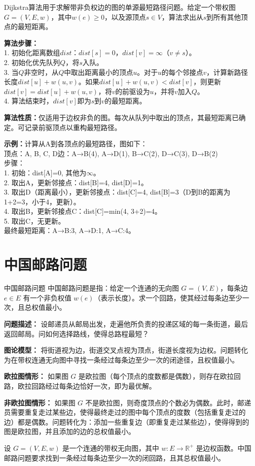 Dijkstra算法用于求解带非负权边的图的单源最短路径问题。给定一个带权图$G=(V,E,w)$，其中$w(e)\geqslant 0$，以及源顶点$s\in V$，算法求出从$s$到所有其他顶点的最短距离。

\textbf{算法步骤：}\\
1. 初始化距离数组$dist$：$dist[s]=0$，$dist[v]=\infty$（$v\neq s$）。\\
2. 初始化优先队列$Q$，将$s$入队。\\
3. 当$Q$非空时，从$Q$中取出距离最小的顶点$u$。对于$u$的每个邻接点$v$，计算新路径长度$dist[u]+w(u,v)$。如果$dist[u]+w(u,v)<dist[v]$，则更新$dist[v]=dist[u]+w(u,v)$，将$v$的前驱设为$u$，并将$v$加入$Q$。\\
4. 算法结束时，$dist[v]$即为$s$到$v$的最短距离。

\textbf{算法性质：}仅适用于边权非负的图。每次从队列中取出的顶点，其最短距离已确定。可记录前驱顶点以重构最短路径。

\textbf{示例：}计算从A到各顶点的最短路径，图如下：\\
顶点：A, B, C, D\quad 边：A→B(4), A→D(1), B→C(2), D→C(3), D→B(2)\\
步骤：\\
1. 初始：dist[A]=0, 其他为$\infty$。\\
2. 取出A，更新邻接点：dist[B]=4, dist[D]=1。
\\
3. 取出D（距离最小），更新邻接点：dist[C]=4, dist[B]=3（D到B的距离为1+2=3，小于4，更新）。\\
4. 取出B，更新邻接点C：dist[C]=min(4, 3+2)=4。\\
5. 取出C，无更新。\\
最终最短距离：A→B:3, A→D:1, A→C:4。

\section{中国邮路问题}
\begin{definition}{中国邮路问题}{}
    中国邮路问题是指：给定一个连通的无向图 $G=(V,E)$，每条边 $e\in E$ 有一个非负权值 $w(e)$（表示长度）。求一个回路，使其经过每条边至少一次，且总权值最小。

    \textbf{问题描述：}
    设邮递员从邮局出发，走遍他所负责的投递区域的每一条街道，最后返回邮局。问如何选择路线，使得总路程最短？

    \textbf{图论模型：}
    将街道视为边，街道交叉点视为顶点，街道长度视为边权。问题转化为在带权连通无向图中寻找一条经过每条边至少一次的闭途径，且权值最小。

    \textbf{欧拉图情形：}
    如果图 $G$ 是欧拉图（每个顶点的度数都是偶数），则存在欧拉回路，欧拉回路经过每条边恰好一次，即为最优解。

    \textbf{非欧拉图情形：}
    如果图 $G$ 不是欧拉图，则奇度顶点的个数必为偶数。此时，邮递员需要重复走过某些边，使得最终走过的图中每个顶点的度数（包括重复走过的边）都是偶数。问题转化为：添加一些重复边（即重复走过某些边），使得得到的图是欧拉图，并且添加的边的总权值最小。
\end{definition}
设 $G=(V,E,w)$ 是一个连通的带权无向图，其中 $w: E \to \mathbb{R}^+$ 是边权函数。中国邮路问题要求找到一条经过每条边至少一次的闭回路，且其总权值最小。

